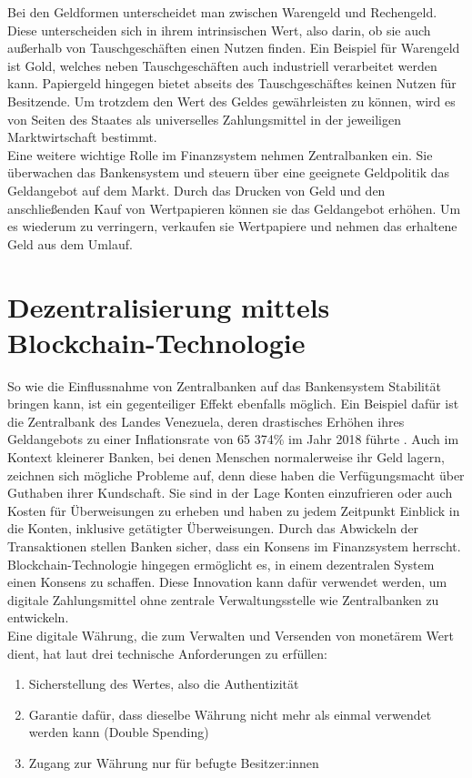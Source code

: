 Bei den Geldformen unterscheidet man zwischen Warengeld und Rechengeld. Diese unterscheiden sich in ihrem intrinsischen Wert, also darin, ob sie auch außerhalb von Tauschgeschäften einen Nutzen finden. Ein Beispiel für Warengeld ist Gold, welches neben Tauschgeschäften auch industriell verarbeitet werden kann.
Papiergeld hingegen bietet abseits des Tauschgeschäftes keinen Nutzen für Besitzende. Um trotzdem den Wert des Geldes gewährleisten zu können, wird es von Seiten des Staates als universelles Zahlungsmittel in der jeweiligen Marktwirtschaft bestimmt.\\

Eine weitere wichtige Rolle im Finanzsystem nehmen Zentralbanken ein. Sie überwachen das Bankensystem und steuern über eine geeignete Geldpolitik das Geldangebot auf dem Markt.
Durch das Drucken von Geld und den anschließenden Kauf von Wertpapieren können sie das Geldangebot erhöhen. Um es wiederum zu verringern, verkaufen sie Wertpapiere und nehmen das erhaltene Geld aus dem Umlauf.\\

\section{Dezentralisierung mittels Blockchain-Technologie}
So wie die Einflussnahme von Zentralbanken auf das Bankensystem Stabilität bringen kann, ist ein gegenteiliger Effekt ebenfalls möglich. Ein Beispiel dafür ist die Zentralbank des Landes Venezuela, deren drastisches Erhöhen ihres Geldangebots zu einer Inflationsrate von 65 374\% im Jahr 2018 führte \cite[]{statista_inflation_2021}. Auch im Kontext kleinerer Banken, bei denen Menschen normalerweise ihr Geld lagern, zeichnen sich mögliche Probleme auf, denn diese haben die Verfügungsmacht über Guthaben ihrer Kundschaft. Sie sind in der Lage Konten einzufrieren oder auch Kosten für Überweisungen zu erheben und haben zu jedem Zeitpunkt Einblick in die Konten, inklusive getätigter Überweisungen. Durch das Abwickeln der Transaktionen stellen Banken sicher, dass ein Konsens im Finanzsystem herrscht.\\

Blockchain-Technologie hingegen ermöglicht es, in einem dezentralen System einen Konsens zu schaffen. Diese Innovation kann dafür verwendet werden, um digitale Zahlungsmittel ohne zentrale Verwaltungsstelle wie Zentralbanken zu entwickeln.\\

Eine digitale Währung, die zum Verwalten und Versenden von monetärem Wert dient, hat laut \cite{antanopoulos_2014} drei technische Anforderungen zu erfüllen:
\begin{enumerate}
	\item Sicherstellung des Wertes, also die Authentizität
	\item Garantie dafür, dass dieselbe Währung nicht mehr als einmal verwendet werden kann (Double Spending)
	\item Zugang zur Währung nur für befugte Besitzer:innen
\end{enumerate}


